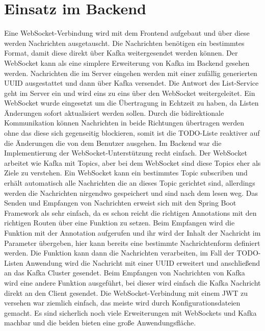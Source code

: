 \section{Einsatz im Backend}
Eine WebSocket-Verbindung wird mit dem Frontend aufgebaut und über diese werden Nachrichten ausgetauscht. Die Nachrichten benötigen ein bestimmtes Format, damit diese direkt über Kafka weitergesendet werden können. Der WebSocket kann als eine simplere Erweiterung von Kafka im Backend gesehen werden. Nachrichten die im Server eingehen werden mit einer zufällig generierten UUID ausgestattet und dann über Kafka versendet. Die Antwort des List-Service geht im Server ein und wird eins zu eins über den WebSocket weitergeleitet. Ein WebSocket wurde eingesetzt um die Übertragung in Echtzeit zu haben, da Listen Änderungen sofort aktualisiert werden sollen. Durch die bidirektionale Kommunikation können Nachrichten in beide Richtungen übertragen werden ohne das diese sich gegenseitig blockieren, somit ist die TODO-Liste reaktiver auf die Änderungen die von dem Benutzer ausgehen. Im Backend war die Implementierung der WebSocket-Unterstützung recht einfach. Der WebSocket arbeitet wie Kafka mit Topics, aber bei dem WebSocket sind diese Topics eher als Ziele zu verstehen. Ein WebSocket kann ein bestimmtes Topic subscriben und erhält automatisch alle Nachrichten die an dieses Topic gerichtet sind, allerdings werden die Nachrichten nirgendwo gespeichert und sind nach dem lesen weg. Das Senden und Empfangen von Nachrichten erweist sich mit den Spring Boot Framework als sehr einfach, da es schon reicht die richtigen Annotations mit den richtigen Routen über eine Funktion zu setzen. Beim Empfangen wird die Funktion mit der Annotation aufgerufen und ihr wird der Inhalt der Nachricht im Parameter übergeben, hier kann bereits eine bestimmte Nachrichtenform definiert werden. Die Funktion kann dann die Nachrichten verarbeiten, im Fall der TODO-Listen Anwendung wird die Nachricht mit einer UUID erweitert und anschließend an das Kafka Cluster gesendet. Beim Empfangen von Nachrichten von Kafka wird eine andere Funktion ausgeführt, bei dieser wird einfach die Kafka Nachricht direkt an den Client gesendet. Die WebSocket-Verbindung mit einem JWT zu versehen war ziemlich einfach, das meiste wird durch Konfigurationsdateien gemacht. Es sind sicherlich noch viele Erweiterungen mit WebSockets und Kafka machbar und die beiden bieten eine große Anwendungsfläche.